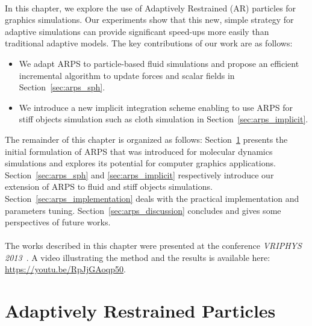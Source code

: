 \paragraph*{}
In this chapter, we explore the use of Adaptively Restrained (AR) particles for graphics simulations. Our experiments show that this new, simple strategy for adaptive simulations can provide significant speed-ups more easily than traditional adaptive models. The key contributions of our work are as follows: 
\begin{itemize}
\item We adapt ARPS to particle-based fluid simulations and propose an efficient incremental algorithm to update forces and scalar fields in Section~\ref{sec:arps_sph}.
\item We introduce a new implicit integration scheme enabling to use ARPS for stiff objects simulation such as cloth simulation in Section~\ref{sec:arps_implicit}.
\end{itemize}

The remainder of this chapter is organized as follows: 
Section~\ref{sec:arps_basics} presents the initial formulation of ARPS that was introduced for molecular dynamics simulations and explores its potential for computer graphics applications. 
Section~\ref{sec:arps_sph} and \ref{sec:arps_implicit} respectively introduce our extension of ARPS to fluid and stiff objects simulations. 
Section~\ref{sec:arps_implementation} deals with the practical implementation and parameters tuning. 
Section~\ref{sec:arps_discussion} concludes and gives some perspectives of future works.
\paragraph*{}
The works described in this chapter were presented at the conference \emph{VRIPHYS 2013}~\cite{Manteaux2013}. A video illustrating the method and the results is available here: \url{https://youtu.be/RpJjGAoqp50}.
\section{Adaptively Restrained Particles} 
\label{sec:arps_basics}
